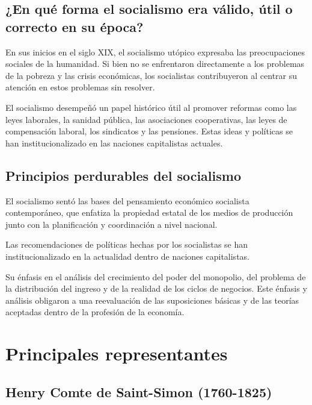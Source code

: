 \documentclass[
  jou,
  floatsintext,
  longtable,
  a4paper,
  nolmodern,
  notxfonts,
  notimes,
  12pt,
  colorlinks=true,linkcolor=blue,citecolor=blue,urlcolor=blue]{apa7}
\begin{document}
\subsection{¿En qué forma el socialismo era válido, útil o correcto en
su
época?}\label{en-quuxe9-forma-el-socialismo-era-vuxe1lido-uxfatil-o-correcto-en-su-uxe9poca}

En sus inicios en el siglo XIX, el socialismo utópico expresaba las
preocupaciones sociales de la humanidad. Si bien no se enfrentaron
directamente a los problemas de la pobreza y las crisis económicas, los
socialistas contribuyeron al centrar su atención en estos problemas sin
resolver.

El socialismo desempeñó un papel histórico útil al promover reformas
como las leyes laborales, la sanidad pública, las asociaciones
cooperativas, las leyes de compensación laboral, los sindicatos y las
pensiones. Estas ideas y políticas se han institucionalizado en las
naciones capitalistas actuales.

\subsection{Principios perdurables del
socialismo}\label{principios-perdurables-del-socialismo}

El socialismo sentó las bases del pensamiento económico socialista
contemporáneo, que enfatiza la propiedad estatal de los medios de
producción junto con la planificación y coordinación a nivel nacional.

Las recomendaciones de políticas hechas por los socialistas se han
institucionalizado en la actualidad dentro de naciones capitalistas.

Su énfasis en el análisis del crecimiento del poder del monopolio, del
problema de la distribución del ingreso y de la realidad de los ciclos
de negocios. Este énfasis y análisis obligaron a una reevaluación de las
suposiciones básicas y de las teorías aceptadas dentro de la profesión
de la economía.

\section{Principales representantes}\label{principales-representantes}

\subsection{Henry Comte de Saint-Simon
(1760-1825)}\label{henry-comte-de-saint-simon-1760-1825}
\end{document}
